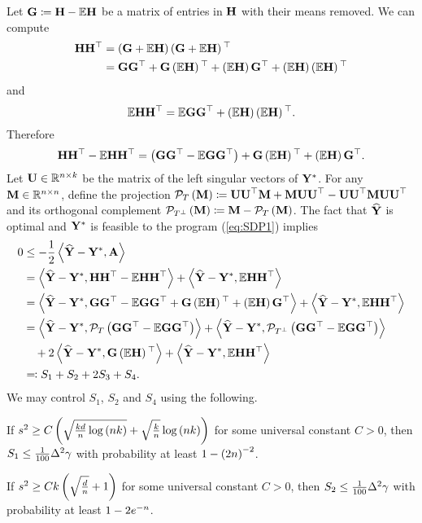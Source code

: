 Let $\G\coloneqq\H-\E\H$ be a matrix of entries in $\H$ with their
means removed. We can compute
\begin{align*}
\H\H\t & =\left(\G+\E\H\right)\left(\G+\E\H\right)\t\\
 & =\G\G\t+\G\left(\E\H\right)\t+\left(\E\H\right)\G\t+\left(\E\H\right)\left(\E\H\right)\t
\end{align*}
and 
\[
\E\H\H^{\top}=\E\G\G\t+\left(\E\H\right)\left(\E\H\right)\t.
\]
Therefore 
\[
\H\H\t-\E\H\H^{\top}=\left(\G\G\t-\E\G\G\t\right)+\G\left(\E\H\right)\t+\left(\E\H\right)\G\t.
\]
Let $\U\in\real^{\num\times\numclust}$ be the matrix of the left
singular vectors of $\Ystar$. For any $\M\in\real^{\num\times\num}$,
define the projection $\PT\left(\M\right)\coloneqq\U\U\t\M+\M\U\U\t-\U\U\t\M\U\U\t$
and its orthogonal complement $\PTperp\left(\M\right)\coloneqq\M-\PT\left(\M\right)$.
The fact that $\Yhat$ is optimal and $\Ystar$ is feasible to the
program (\ref{eq:SDP1}) implies 
\begin{align*}
0 & \leq-\frac{1}{2}\left\langle \Yhat-\Ystar,\Adj\right\rangle \\
 & =\left\langle \Yhat-\Ystar,\H\H\t-\E\H\H^{\top}\right\rangle +\left\langle \Yhat-\Ystar,\E\H\H^{\top}\right\rangle \\
 & =\left\langle \Yhat-\Ystar,\G\G\t-\E\G\G\t+\G\left(\E\H\right)\t+\left(\E\H\right)\G\t\right\rangle +\left\langle \Yhat-\Ystar,\E\H\H^{\top}\right\rangle \\
 & =\left\langle \Yhat-\Ystar,\PT\left(\G\G\t-\E\G\G\t\right)\right\rangle +\left\langle \Yhat-\Ystar,\PTperp\left(\G\G\t-\E\G\G\t\right)\right\rangle \\
 & \quad+2\left\langle \Yhat-\Ystar,\G\left(\E\H\right)\t\right\rangle +\left\langle \Yhat-\Ystar,\E\H\H^{\top}\right\rangle \\
 & \eqqcolon S_{1}+S_{2}+2S_{3}+S_{4}.
\end{align*}
We may control $S_{1}$, $S_{2}$ and $S_{4}$ using the following. 
\begin{prop}
\label{prop:S1} If $\snr^{2}\geq C\left(\sqrt{\frac{\numclust\vecdim}{\num}\log\left(\num\numclust\right)}+\sqrt{\frac{\numclust}{\num}}\log\left(\num\numclust\right)\right)$
for some universal constant $C>0$, then $S_{1}\leq\frac{1}{100}\minsep^{2}\error$
with probability at least $1-\left(2\num\right)^{-2}$.
\end{prop}

\begin{prop}
\label{prop:S2} If $\snr^{2}\geq C\numclust\left(\sqrt{\frac{\vecdim}{\num}}+1\right)$
for some universal constant $C>0$, then $S_{2}\leq\frac{1}{100}\minsep^{2}\error$
with probability at least $1-2e^{-\num}$.
\end{prop}

